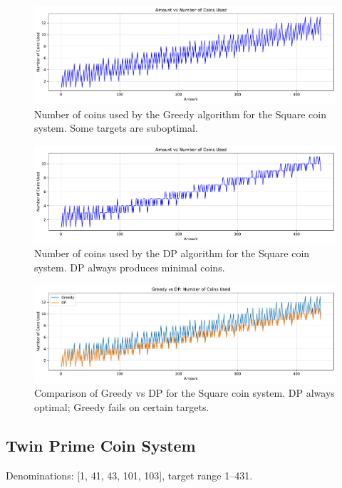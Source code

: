 \documentclass[12pt,a4paper]{report}
\begin{document}
\begin{figure}[H]
  \centering
  \includegraphics[width=\textwidth]{graphs/greedy_coins_square_plot.pdf}
  \caption{Number of coins used by the Greedy algorithm for the Square coin system. Some targets are suboptimal.}
  \label{fig:greedy_coins_square_plot}
\end{figure}

\begin{figure}[H]
  \centering
  \includegraphics[width=\textwidth]{graphs/dp_coins_square_plot.pdf}
  \caption{Number of coins used by the DP algorithm for the Square coin system. DP always produces minimal coins.}
  \label{fig:dp_coins_square_plot}
\end{figure}

\begin{figure}[H]
  \centering
  \includegraphics[width=\textwidth]{graphs/compare_coins_square_plot.pdf}
  \caption{Comparison of Greedy vs DP for the Square coin system. DP always optimal; Greedy fails on certain targets.}
  \label{fig:compare_coins_square_plot}
\end{figure}


\subsection{Twin Prime Coin System}
Denominations: [1, 41, 43, 101, 103], target range 1--431.
\end{document}
